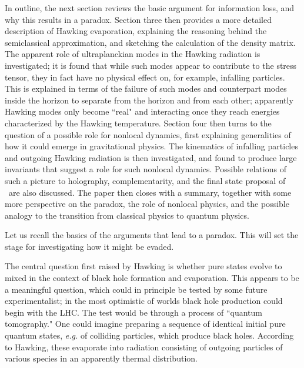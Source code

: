 In outline, the next section  reviews the basic argument for information loss, and why this results in a paradox.  Section three then provides a more detailed description of Hawking evaporation, explaining the reasoning behind the semiclassical approximation, and sketching the calculation of the density matrix.  The apparent role of ultraplanckian modes in the Hawking radiation is investigated; it is found that while such modes appear to contribute to the stress tensor, they in fact have no physical effect on, for example, infalling particles.  This is explained in terms of the failure of such modes and counterpart modes inside the horizon to separate from the horizon and from each other;
apparently Hawking modes only become ``real" and interacting once they reach energies characterized by the Hawking temperature.  Section four then turns to the question of a possible role for nonlocal dynamics, first explaining generalities of how it could emerge in gravitational physics.  The kinematics of infalling particles and outgoing Hawking radiation is then investigated, and found to produce large invariants that suggest a role for such nonlocal dynamics.  Possible relations of such a picture to holography, complementarity, and the final state proposal of \HoMa\ are also discussed.  The paper then closes with a summary, together with some more perspective on the paradox, the role of nonlocal physics, and the possible analogy to the transition from classical physics to quantum physics.



Let us recall the basics of the arguments that lead to a paradox. This will set the stage for investigating how it might be evaded.

The central question first raised by Hawking is whether pure states evolve to mixed in the context of black hole formation and evaporation.  This appears to be a meaningful question, which could in principle be tested by some future experimentalist; in the most optimistic of worlds black hole production could begin with the LHC. The test would be through a process of  ``quantum tomography."  One could imagine preparing a sequence of identical initial pure quantum states, {\it e.g.} of colliding particles, which produce black holes.  According to Hawking, these evaporate into radiation  consisting of outgoing particles of various species in an apparently thermal distribution.  

